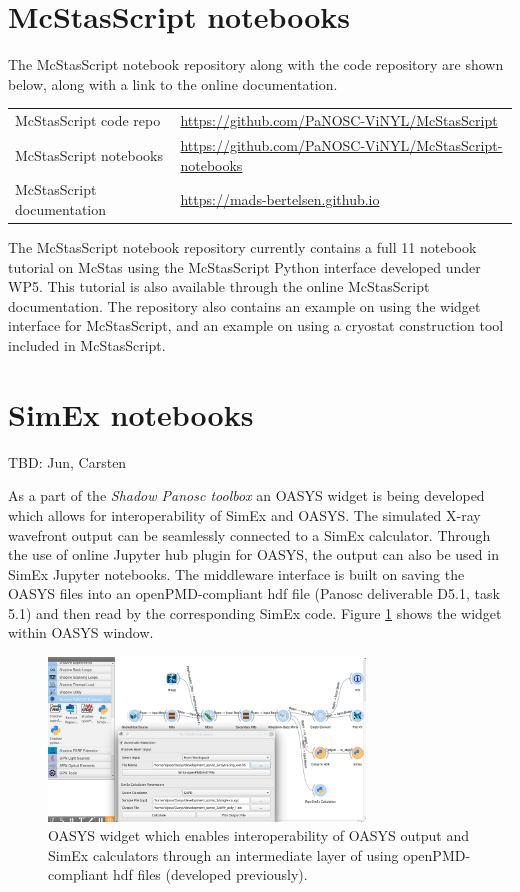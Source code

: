\documentclass[10pt]{scrartcl}
\begin{document}
\section{McStasScript notebooks}
\label{sec:mcstas}
The McStasScript notebook repository along with the code repository are shown below, along with a link to the online documentation.
\begin{center}
\begin{tabular}{l l}
McStasScript code repo  & \url{https://github.com/PaNOSC-ViNYL/McStasScript} \\ 
McStasScript notebooks & \url{https://github.com/PaNOSC-ViNYL/McStasScript-notebooks} \\  
McStasScript documentation & \url{https://mads-bertelsen.github.io}
\end{tabular}
\end{center}
The McStasScript notebook repository currently contains a full 11 notebook
tutorial on McStas using the McStasScript Python interface developed under WP5.
This tutorial is also available through the online McStasScript documentation.
The repository also contains an example on using the widget interface for
McStasScript, and an example on using a cryostat construction tool included in
McStasScript.

\section{SimEx notebooks}
\label{sec:simex}
TBD: Jun, Carsten

As a part of the \emph{Shadow Panosc toolbox} an OASYS widget is being developed which allows for interoperability of SimEx and OASYS. The simulated X-ray wavefront output can be seamlessly connected to a SimEx calculator. Through the use of online Jupyter hub plugin for OASYS, the output can also be used in SimEx Jupyter notebooks. The middleware interface is built on saving the OASYS files into an openPMD-compliant hdf file (Panosc deliverable D5.1, task 5.1) and then read by the corresponding SimEx code. Figure \ref{fig:simex_oasys_widget} shows the widget within OASYS window.

\begin{figure}[htb]
    \centering
    \includegraphics[width=0.75\textwidth]{figures/simexOasysWidget.png}
    \caption{OASYS widget which enables interoperability of OASYS output and SimEx calculators through an intermediate layer of using openPMD-compliant hdf files (developed previously).}
    \label{fig:simex_oasys_widget}
\end{figure}
\end{document}
